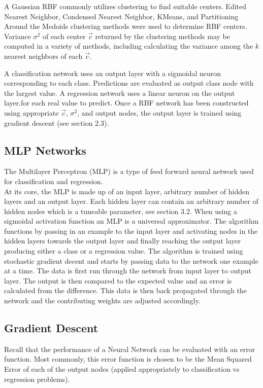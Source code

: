 \documentclass[twoside,11pt]{article}
\begin{document}
	A Gaussian RBF commonly utilizes clustering to find suitable centers. Edited Nearest Neighbor, Condensed Nearest Neighbor, KMeans, and Partitioning Around the Medoids clustering methods were used to determine RBF centers. Variance $\sigma^2$ of each center $\vec c$ returned by the clustering methods may be computed in a variety of methods, including calculating the variance among the $k$ nearest neighbors of each $\vec c$. 
	
	A classification network uses an output layer with a sigmoidal neuron corresponding to each class. Predictions are evaluated as output class node with the largest value. A regression network uses a linear neuron on the output layer.for each real value to predict. Once a RBF network has been constructed using appropriate $\vec c$, $\sigma^2$, and output nodes, the output layer is trained using gradient descent (see section 2.3). 
	

\subsection{MLP Networks}
The Multilayer Perceptron (MLP) is a type of feed forward neural network used for classification and regression. \\
\indent At its core, the MLP is made up of an input layer, arbitrary number of hidden layers and an output layer. Each hidden layer can contain an arbitrary number of hidden nodes which is a tuneable parameter, see section 3.2.  When using a sigmoidal activation function an MLP is a universal approximator. The algorithm functions by passing in an example to the input layer and activating nodes in the hidden layers towards the output layer and finally reaching the output layer producing either a class or a regression value. The algorithm is trained using stochastic gradient decent and starts by passing data to the network one example at a time. The data is first run through the network from input layer to output layer. The output is then compared to the expected value and an error is calculated from the difference. This data is then back propagated through the network and the contributing weights are adjusted accordingly. 
\subsection{Gradient Descent}
Recall that the performance of a Neural Network can be evaluated with an error function.
Most commonly, this error function is chosen to be the Mean Squared Error of each of the output nodes (applied appropriately to classification vs regression problems).
\end{document}
